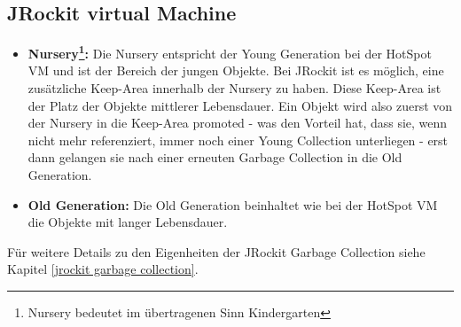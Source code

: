 \subsection{JRockit virtual Machine}
\begin{itemize}
	\item \textbf{Nursery\footnote{Nursery bedeutet im übertragenen Sinn Kindergarten}:} Die Nursery entspricht der Young Generation bei der HotSpot VM und ist der Bereich der jungen Objekte. Bei JRockit ist es möglich, eine zusätzliche Keep-Area innerhalb der Nursery zu haben. Diese Keep-Area ist der Platz der Objekte mittlerer Lebensdauer. Ein Objekt wird also zuerst von der Nursery in die Keep-Area promoted - was den Vorteil hat, dass sie, wenn nicht mehr referenziert, immer noch einer Young Collection unterliegen - erst dann gelangen sie nach einer erneuten Garbage Collection in die Old Generation.
	\item \textbf{Old Generation: } Die Old Generation beinhaltet wie bei der HotSpot VM die Objekte mit langer Lebensdauer.
\end{itemize}
Für weitere Details zu den Eigenheiten der JRockit Garbage Collection siehe Kapitel \ref{jrockit garbage collection}.


